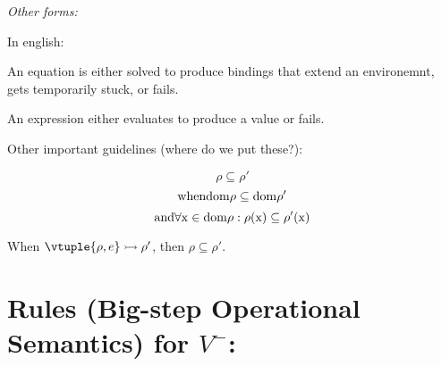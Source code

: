 \documentclass[]{article}
\begin{document}
    \it{Other forms:}


    In english: 
    
    An equation is either solved to produce bindings that extend an environemnt,
    gets temporarily stuck, or fails. 

    An expression either evaluates to produce a value or fails. 

    \bigskip
    
    Other important guidelines (where do we put these?):
    
$$\rho \subseteq \rho'$$
$$ \rm{when dom } \rho \subseteq \rm{dom } \rho'$$
$$ \rm{and } \forall x \in \rm{dom } \rho: \rho(x) \subseteq \rho'(x)$$

\bigskip

When ${\vtuple{\rho, e}} \rightarrowtail{} {\rho'}$, then $\rho \subseteq \rho'$.

\bigskip

\section{Rules (Big-step Operational Semantics) for $V^{-}$:}

    

\newcommand\GeCtxStuckRule[1][Left]{%
\inferrule*[#1=\textsc{ (Ge-Ctx-Stuck) }]
    {\inferrule*{}{\EquationTempStuck} 
    \and
    \inferrule*{}{\CtxToRho}
    \and 
    \inferrule*{}{\EvalGeSucc}
    }
    {\GeEqCtxEval}
}

\mpar{\GeCtxStuckRule}




\newcommand\GeEqStuckRule{%
\inferrule*[Left=\textsc{ (Ge-Eq-Succ) }]
{\GeCtxStuckRule[Right]}
{\GeCtxEqEval}
}

\mpar{\GeEqStuckRule}


\newcommand\GeCtxSuccRule{%
\inferrule*[Left=\textsc{ (Ge-Ctx-Succ) }]
    {\inferrule*{}{\EquationSuccess} 
    \and 
    \inferrule*{}{\EvalGeSucc[\rhohat]}
    }
    {\GeEqCtxEval}
}
\end{document}

